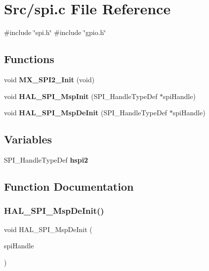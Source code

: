 \section{Src/spi.c File Reference}
\label{spi_8c}
{\ttfamily \#include \char`\"{}spi.\+h\char`\"{}}\newline
{\ttfamily \#include \char`\"{}gpio.\+h\char`\"{}}\newline
\subsection*{Functions}
\begin{DoxyCompactItemize}
\item 
void \textbf{ M\+X\+\_\+\+S\+P\+I2\+\_\+\+Init} (void)
\item 
void \textbf{ H\+A\+L\+\_\+\+S\+P\+I\+\_\+\+Msp\+Init} (S\+P\+I\+\_\+\+Handle\+Type\+Def $\ast$spi\+Handle)
\item 
void \textbf{ H\+A\+L\+\_\+\+S\+P\+I\+\_\+\+Msp\+De\+Init} (S\+P\+I\+\_\+\+Handle\+Type\+Def $\ast$spi\+Handle)
\end{DoxyCompactItemize}
\subsection*{Variables}
\begin{DoxyCompactItemize}
\item 
S\+P\+I\+\_\+\+Handle\+Type\+Def \textbf{ hspi2}
\end{DoxyCompactItemize}


\subsection{Function Documentation}
\mbox{\label{spi_8c_af9af6cae4cb9386b709196d3a3ab4f78}} 
\subsubsection{H\+A\+L\+\_\+\+S\+P\+I\+\_\+\+Msp\+De\+Init()}
{\footnotesize\ttfamily void H\+A\+L\+\_\+\+S\+P\+I\+\_\+\+Msp\+De\+Init (\begin{DoxyParamCaption}\item[{S\+P\+I\+\_\+\+Handle\+Type\+Def $\ast$}]{spi\+Handle }\end{DoxyParamCaption})}

